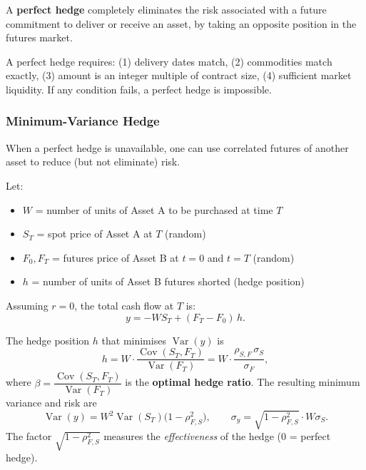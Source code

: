\begin{definition}
  A \textbf{perfect hedge} completely eliminates the risk associated with a future commitment to deliver or receive an asset, by taking an opposite position in the futures market.
\end{definition}

\begin{remark}
  A perfect hedge requires: (1) delivery dates match, (2) commodities match exactly, (3) amount is an integer multiple of contract size, (4) sufficient market liquidity. If any condition fails, a perfect hedge is impossible.
\end{remark}

\subsubsection{Minimum-Variance Hedge}

When a perfect hedge is unavailable, one can use correlated futures of another asset to reduce (but not eliminate) risk.

\begin{definition}[Setup]
  Let:
  \begin{itemize}
    \item $W$ = number of units of Asset A to be purchased at time $T$
    \item $S_T$ = spot price of Asset A at $T$ (random)
    \item $F_0, F_T$ = futures price of Asset B at $t=0$ and $t=T$ (random)
    \item $h$ = number of units of Asset B futures shorted (hedge position)
  \end{itemize}
  Assuming $r=0$, the total cash flow at $T$ is:
  \[
    y = -W S_T + (F_T - F_0)\,h.
  \]
\end{definition}

\begin{theorem}\label{thm: min-var-hedge}
  The hedge position $h$ that minimises $\operatorname{Var}(y)$ is
  \[
    h = W \cdot \frac{\operatorname{Cov}(S_T, F_T)}{\operatorname{Var}(F_T)} = W \cdot \frac{\rho_{S,F} \,\sigma_S}{\sigma_F},
  \]
  where $\beta = \dfrac{\operatorname{Cov}(S_T, F_T)}{\operatorname{Var}(F_T)}$ is the \textbf{optimal hedge ratio}. The resulting minimum variance and risk are
  \[
    \operatorname{Var}(y) = W^2 \operatorname{Var}(S_T)\bigl(1 - \rho_{F,S}^2\bigr), \qquad \sigma_y = \sqrt{1-\rho_{F,S}^2} \cdot W\sigma_S.
  \]
  The factor $\sqrt{1 - \rho_{F,S}^2}$ measures the \emph{effectiveness} of the hedge ($0$ = perfect hedge).
\end{theorem}

